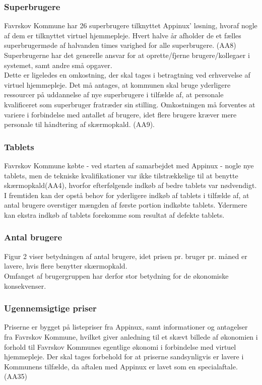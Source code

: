 \subsubsection{Superbrugere}
Favrskov Kommune har 26 superbrugere tilknyttet Appinux’ løsning, hvoraf nogle af dem er tilknyttet virtuel hjemmepleje. Hvert halve år afholder de et fælles superbrugermøde af halvanden times varighed for alle superbrugere. (AA8)\\
Superbrugerne har det generelle ansvar for at oprette/fjerne brugere/kollegaer i systemet, samt andre små opgaver. \\
Dette er ligeledes en omkostning, der skal tages i betragtning ved erhvervelse af virtuel hjemmepleje. Det må antages, at kommunen skal bruge yderligere ressourcer på uddannelse af nye superbrugere i tilfælde af, at personale kvalificeret som superbruger fratræder sin stilling. 
Omkostningen må forventes at variere i forbindelse med antallet af brugere, idet flere brugere kræver mere personale til håndtering af skærmopkald. (AA9).

\subsubsection{Tablets}
Favrskov Kommune købte - ved starten af samarbejdet med Appinux - nogle nye tablets, men de tekniske kvalifikationer var ikke tilstrækkelige til at benytte skærmopkald(AA4), hvorfor efterfølgende indkøb af bedre tablets var nødvendigt.\\
I fremtiden kan der opstå behov for yderligere indkøb af tablets i tilfælde af, at antal brugere overstiger mængden af første portion indkøbte tablets. Ydermere kan ekstra indkøb af tablets forekomme som resultat af defekte tablets.

\subsubsection{Antal brugere}
Figur 2 viser betydningen af antal brugere, idet prisen pr. bruger pr. måned er lavere, hvis flere benytter skærmopkald.\\
Omfanget af brugergruppen har derfor stor betydning for de økonomiske konsekvenser. 

\subsubsection{Ugennemsigtige priser}
Priserne er bygget på listepriser fra Appinux, samt informationer og antagelser fra Favrskov Kommune, hvilket giver anledning til et skævt billede af økonomien i forhold til Favrskov Kommunes egentlige økonomi i forbindelse med virtuel hjemmepleje. Der skal tages forbehold for at priserne sandsynligvis er lavere i Kommunens tilfælde, da aftalen med Appinux er lavet som en specialaftale.(AA35)

